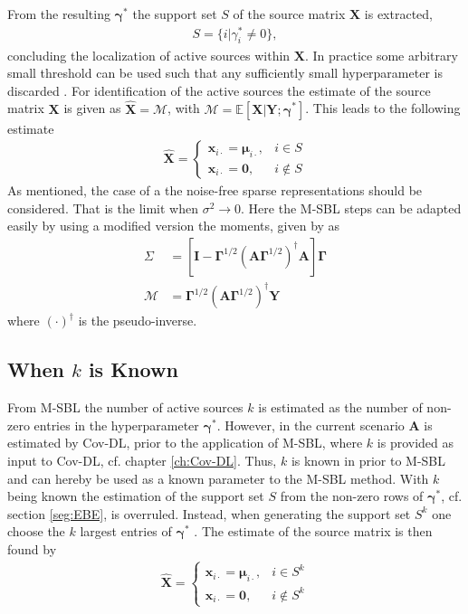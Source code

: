 From the resulting $\boldsymbol{\gamma}^\ast$ the support set $S$ of the source matrix $\mathbf{X}$ is extracted, 
\begin{align*}
S = \{ i \vert \gamma_i^{\ast} \neq 0 \},
\end{align*}
concluding the localization of active sources within $\mathbf{X}$. 
In practice some arbitrary small threshold can be used such that any sufficiently small hyperparameter is discarded \cite[p. 149]{phd_wipf}.
For identification of the active sources the estimate of the source matrix $\mathbf{X}$ is given as $\hat{\mathbf{X}} = \mathcal{M} $, with $\mathcal{M} = \mathbb{E}[\mathbf{X}\vert \mathbf{Y} ; \boldsymbol{\gamma}^{\ast}]$. 
This leads to the following estimate  
\begin{align*}
\hat{\mathbf{X}} = 
\begin{cases}
\mathbf{x}_{i\cdot} = \boldsymbol{\mu}_{i \cdot}, & i \in S \\
\mathbf{x}_{i\cdot} = \mathbf{0}, & i \not \in S
\end{cases}
\end{align*}
As mentioned, the case of a the noise-free sparse representations should be considered. 
That is the limit when $\sigma^2 \rightarrow 0$. Here the M-SBL steps can be adapted easily by using a modified version the moments, given by \cite[p. 148]{phd_wipf} as 
\begin{align*}
\Sigma &= \left[ \textbf{I} - \boldsymbol{\Gamma}^{1/2} \left( \mathbf{A} \boldsymbol{\Gamma}^{1/2}\right)^{\dagger} \mathbf{A} \right]\boldsymbol{\Gamma}\\
\mathcal{M} &= \boldsymbol{\Gamma}^{1/2}\left( \mathbf{A} \boldsymbol{\Gamma}^{1/2}\right)^{\dagger} \mathbf{Y}
\end{align*} 
where $(\cdot)^{\dagger}$ is the pseudo-inverse.

\subsection{When $k$ is Known}\label{subsec:kestimate}
From M-SBL the number of active sources $k$ is estimated as the number of non-zero entries in the hyperparameter $\boldsymbol{\gamma}^{\ast}$.
However, in the current scenario $\mathbf{A}$ is estimated by Cov-DL, prior to the application of M-SBL, where $k$ is provided as input to Cov-DL, cf. chapter \ref{ch:Cov-DL}.
Thus, $k$ is known in prior to M-SBL and can hereby be used as a known parameter to the M-SBL method. 
With $k$ being known the estimation of the support set $S$ from the non-zero rows of $\boldsymbol{\gamma}^{\ast}$, cf. section \ref{seg:EBE}, is overruled.
Instead, when generating the support set $S^k$ one choose the $k$ largest entries of $\boldsymbol{\gamma}^{\ast}$ \cite[p. 3]{Balkan2014}.
The estimate of the source matrix is then found by
\begin{align*}
\hat{\mathbf{X}} = 
\begin{cases}
\mathbf{x}_{i\cdot} = \boldsymbol{\mu}_{i \cdot}, & i \in S^k \\
\mathbf{x}_{i\cdot} = \mathbf{0}, & i \not \in S^k
\end{cases}
\end{align*}

